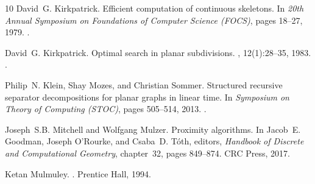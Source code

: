 \documentclass[10pt,a4paper]{amsart}
\begin{document}
\begin{thebibliography}{10}
David~G. Kirkpatrick.
\newblock Efficient computation of continuous skeletons.
\newblock In {\em 20th Annual Symposium on Foundations of Computer Science
  ({FOCS})}, pages 18--27, 1979.
\newblock \href {https://doi.org/10.1109/SFCS.1979.15}
  {}.

David~G. Kirkpatrick.
\newblock Optimal search in planar subdivisions.
, 12(1):28--35, 1983.
\newblock \href {https://doi.org/10.1137/0212002} {}.

Philip~N. Klein, Shay Mozes, and Christian Sommer.
\newblock Structured recursive separator decompositions for planar graphs in
  linear time.
\newblock In {\em Symposium on Theory of Computing ({STOC})}, pages 505--514,
  2013.
\newblock \href {https://doi.org/10.1145/2488608.2488672}
  {}.

Joseph~S.B. Mitchell and Wolfgang Mulzer.
\newblock Proximity algorithms.
\newblock In Jacob~E. Goodman, Joseph O'Rourke, and Csaba~D. T\'{o}th, editors,
  {\em Handbook of Discrete and Computational Geometry}, chapter~32, pages
  849--874. CRC Press, 2017.

Ketan Mulmuley.
.
\newblock Prentice Hall, 1994.

\end{thebibliography}
\end{document}
